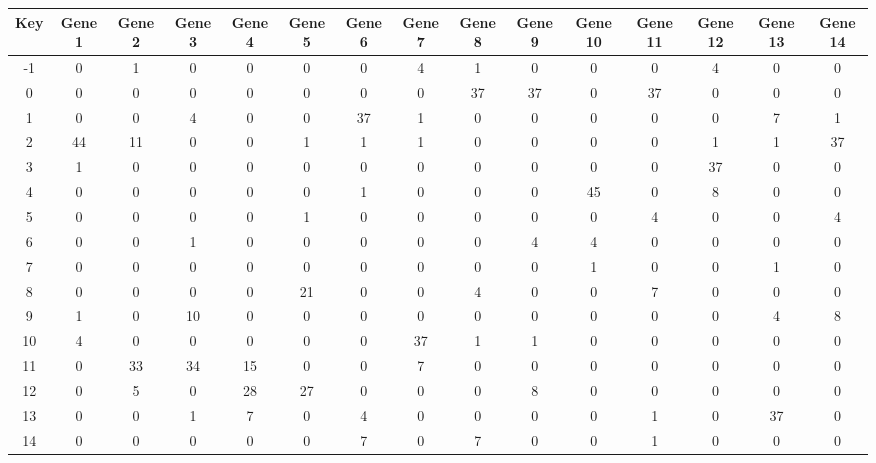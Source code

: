 \begin{tabular}{|c|c|c|c|c|c|c|c|c|c|c|c|c|c|c|}
\hline
Key & Gene 1 & Gene 2 & Gene 3 & Gene 4 & Gene 5 & Gene 6 & Gene 7 & Gene 8 & Gene 9 & Gene 10 & Gene 11 & Gene 12 & Gene 13 & Gene 14 \\
\hline
-1 & 0 & 1 & 0 & 0 & 0 & 0 & 4 & 1 & 0 & 0 & 0 & 4 & 0 & 0 \\
0 & 0 & 0 & 0 & 0 & 0 & 0 & 0 & 37 & 37 & 0 & 37 & 0 & 0 & 0 \\
1 & 0 & 0 & 4 & 0 & 0 & 37 & 1 & 0 & 0 & 0 & 0 & 0 & 7 & 1 \\
2 & 44 & 11 & 0 & 0 & 1 & 1 & 1 & 0 & 0 & 0 & 0 & 1 & 1 & 37 \\
3 & 1 & 0 & 0 & 0 & 0 & 0 & 0 & 0 & 0 & 0 & 0 & 37 & 0 & 0 \\
4 & 0 & 0 & 0 & 0 & 0 & 1 & 0 & 0 & 0 & 45 & 0 & 8 & 0 & 0 \\
5 & 0 & 0 & 0 & 0 & 1 & 0 & 0 & 0 & 0 & 0 & 4 & 0 & 0 & 4 \\
6 & 0 & 0 & 1 & 0 & 0 & 0 & 0 & 0 & 4 & 4 & 0 & 0 & 0 & 0 \\
7 & 0 & 0 & 0 & 0 & 0 & 0 & 0 & 0 & 0 & 1 & 0 & 0 & 1 & 0 \\
8 & 0 & 0 & 0 & 0 & 21 & 0 & 0 & 4 & 0 & 0 & 7 & 0 & 0 & 0 \\
9 & 1 & 0 & 10 & 0 & 0 & 0 & 0 & 0 & 0 & 0 & 0 & 0 & 4 & 8 \\
10 & 4 & 0 & 0 & 0 & 0 & 0 & 37 & 1 & 1 & 0 & 0 & 0 & 0 & 0 \\
11 & 0 & 33 & 34 & 15 & 0 & 0 & 7 & 0 & 0 & 0 & 0 & 0 & 0 & 0 \\
12 & 0 & 5 & 0 & 28 & 27 & 0 & 0 & 0 & 8 & 0 & 0 & 0 & 0 & 0 \\
13 & 0 & 0 & 1 & 7 & 0 & 4 & 0 & 0 & 0 & 0 & 1 & 0 & 37 & 0 \\
14 & 0 & 0 & 0 & 0 & 0 & 7 & 0 & 7 & 0 & 0 & 1 & 0 & 0 & 0 \\
\hline
\end{tabular}